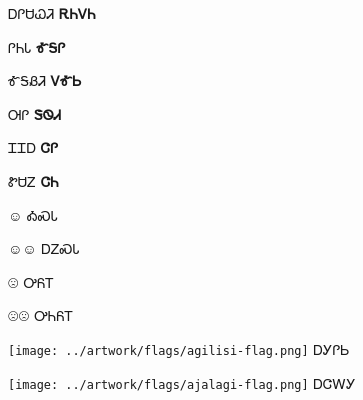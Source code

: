 \documentclass[avery5371]{flashcards}%
\begin{document}

\begin{flashcard}{\Huge ᎠᎵᏌᏇᏘ}
\bf\Huge ᎡᏂᏙᏂ
\end{flashcard}

\begin{flashcard}{\Huge ᎵᏂᏓ}
\bf\Huge ᎹᎦᎵ
\end{flashcard}

\begin{flashcard}{\Huge ᎹᎦᏰᏘ}
\bf\Huge ᏙᎹᏏ
\end{flashcard}

\begin{flashcard}{\Huge ᎺᎵ}
\bf\Huge ᏕᏫᏗ
\end{flashcard}

\begin{flashcard}{\Huge ᏆᏆᎠ}
\bf\Huge ᏣᎵ
\end{flashcard}

\begin{flashcard}{\Huge ᏑᏌᏃ}
\bf\Huge ᏣᏂ
\end{flashcard}


\begin{flashcard}{\normalfont\Huge\fontsize{128pt}{128pt}\selectfont ☺}
\Huge ᎣᏍᏓ
\end{flashcard}

\begin{flashcard}{\normalfont\Huge\fontsize{128pt}{128pt}\selectfont ☺☺}
\Huge ᎠᏃᏍᏓ
\end{flashcard}

\begin{flashcard}{\normalfont\Huge\fontsize{128pt}{128pt}\selectfont ☹}
\Huge ᎤᏲᎢ
\end{flashcard}

\begin{flashcard}{\normalfont\Huge\fontsize{128pt}{128pt}\selectfont ☹☹}
\Huge ᎤᏂᏲᎢ
\end{flashcard}


\begin{flashcard}{
\texttt{[image: ../artwork/flags/agilisi-flag.png]}
}
\Huge ᎠᎩᎵᏏ
\end{flashcard}

\begin{flashcard}{
\texttt{[image: ../artwork/flags/ajalagi-flag.png]}
}
\Huge ᎠᏣᎳᎩ
\end{flashcard}
\end{document}

